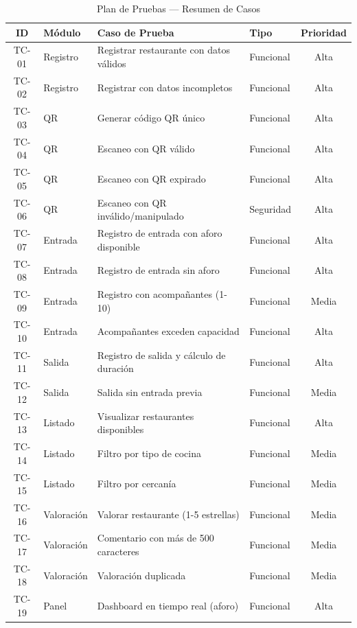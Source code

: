 \begin{table}[H]
    \centering
    \caption{Plan de Pruebas — Resumen de Casos}
    \label{tab:plan_pruebas}
    \small
    \begin{tabular}{|c|l|l|l|c|}
        \hline
        \textbf{ID} & \textbf{Módulo} & \textbf{Caso de Prueba} & \textbf{Tipo} & \textbf{Prioridad} \\
        \hline
        TC-01 & Registro & Registrar restaurante con datos válidos & Funcional & Alta \\
        TC-02 & Registro & Registrar con datos incompletos & Funcional & Alta \\
        TC-03 & QR & Generar código QR único & Funcional & Alta \\
        TC-04 & QR & Escaneo con QR válido & Funcional & Alta \\
        TC-05 & QR & Escaneo con QR expirado & Funcional & Alta \\
        TC-06 & QR & Escaneo con QR inválido/manipulado & Seguridad & Alta \\
        TC-07 & Entrada & Registro de entrada con aforo disponible & Funcional & Alta \\
        TC-08 & Entrada & Registro de entrada sin aforo & Funcional & Alta \\
        TC-09 & Entrada & Registro con acompañantes (1-10) & Funcional & Media \\
        TC-10 & Entrada & Acompañantes exceden capacidad & Funcional & Alta \\
        TC-11 & Salida & Registro de salida y cálculo de duración & Funcional & Alta \\
        TC-12 & Salida & Salida sin entrada previa & Funcional & Media \\
        TC-13 & Listado & Visualizar restaurantes disponibles & Funcional & Alta \\
        TC-14 & Listado & Filtro por tipo de cocina & Funcional & Media \\
        TC-15 & Listado & Filtro por cercanía & Funcional & Media \\
        TC-16 & Valoración & Valorar restaurante (1-5 estrellas) & Funcional & Media \\
        TC-17 & Valoración & Comentario con más de 500 caracteres & Funcional & Media \\
        TC-18 & Valoración & Valoración duplicada & Funcional & Media \\
        TC-19 & Panel & Dashboard en tiempo real (aforo) & Funcional & Alta \\

\end{tabular}
\end{table}
